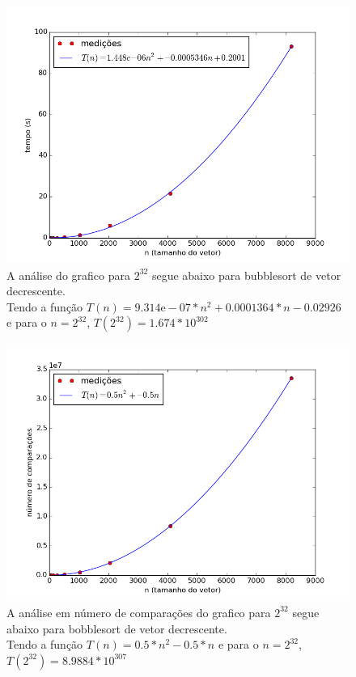 \documentclass[12pt,a4paper,twoside]{report}
\begin{document}


\begin{figure}[ht]
\centering \includegraphics[scale=0.8]{../bolha/imagens/bolhaDecrescente0.png}
\caption{A análise do grafico para $2^{32}$ segue abaixo para bubblesort de vetor decrescente.\\
Tendo a função $T(n) = 9.314\mathrm{e}-07*n^2+0.0001364*n-0.02926$ e para o $n =2^{32}$, $T(2^{32}) = 1.674 * 10^302$}
\label{fig:bolhaDecrescente0}
\end{figure}

\begin{figure}[ht]
\centering \includegraphics[scale=0.8]{../bolha/imagens/bolhaDecrescente1.png}
\caption{A análise em número de comparações do grafico para $2^{32}$ segue abaixo para bobblesort de vetor decrescente.\\
Tendo a função $T(n) = 0.5*n^2 - 0.5*n$ e para o $n =2^{32}$, $T(2^{32}) = 8.9884 * 10^{307}$}
\label{fig:bolhaDecrescente1}
\end{figure}
\end{document}
